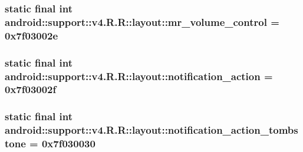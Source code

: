 \hypertarget{classandroid_1_1support_1_1v4_1_1_r_1_1layout_c11bdd89a28ec05c0998a97dedb5d37f}{
\subsubsection[{mr\_\-volume\_\-control}]{\setlength{\rightskip}{0pt plus 5cm}static final int android::support::v4.R.R::layout::mr\_\-volume\_\-control = 0x7f03002e}}
\label{classandroid_1_1support_1_1v4_1_1_r_1_1layout_c11bdd89a28ec05c0998a97dedb5d37f}


\hypertarget{classandroid_1_1support_1_1v4_1_1_r_1_1layout_ff2d9cb9460b3066257d303649fd3d8c}{
\subsubsection[{notification\_\-action}]{\setlength{\rightskip}{0pt plus 5cm}static final int android::support::v4.R.R::layout::notification\_\-action = 0x7f03002f}}
\label{classandroid_1_1support_1_1v4_1_1_r_1_1layout_ff2d9cb9460b3066257d303649fd3d8c}


\hypertarget{classandroid_1_1support_1_1v4_1_1_r_1_1layout_ce1e8f5b115b41aba8132790bea446e0}{
\subsubsection[{notification\_\-action\_\-tombstone}]{\setlength{\rightskip}{0pt plus 5cm}static final int android::support::v4.R.R::layout::notification\_\-action\_\-tombstone = 0x7f030030}}
\label{classandroid_1_1support_1_1v4_1_1_r_1_1layout_ce1e8f5b115b41aba8132790bea446e0}


